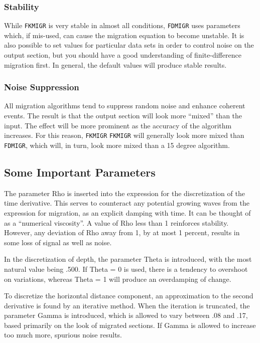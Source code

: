 \subsubsection{Stability}
While \texttt{FKMIGR} is very stable in almost all conditions, \texttt{FDMIGR}
uses parameters which, if mis-used, can cause the migration equation to
become unstable. It is also possible to set values for particular data
sets in order to control noise on the output section, but you should
have a good understanding of finite-difference migration first. In
general, the default values will produce stable  results.

\subsubsection{Noise Suppression}
All migration algorithms tend to suppress random noise and
enhance coherent events.  The result is that the output section will
look more ``mixed'' than the input.  The effect will be more prominent as
the accuracy of the algorithm increases.  For this reason, \texttt{FKMIGR} \texttt{FKMIGR}
will generally look more mixed than \texttt{FDMIGR}, which will, in turn, look
more mixed than a 15 degree algorithm.

\subsection{Some Important Parameters}

The parameter Rho is inserted into the expression for the discretization
of the time derivative. This serves to counteract any potential growing
waves from the expression for migration, as an explicit damping with
time. It can be thought of as a ``numerical  viscosity''.  A value of Rho
less than 1 reinforces stability.  However, any deviation of Rho away
from 1, by at most 1 percent, results in some loss of signal as well as
noise.

In the discretization of depth, the parameter Theta is introduced, with
the most natural value being .500.  If Theta = 0 is used, there is a
tendency to overshoot on variations, whereas Theta = 1 will produce an
overdamping of change.

To discretize the horizontal distance component, an approximation to the
second derivative is found by an iterative method.  When the iteration
is truncated, the parameter Gamma is introduced, which is allowed to
vary between .08 and .17, based primarily on the look of migrated
sections.  If Gamma is allowed to increase too much more, spurious noise
results.

